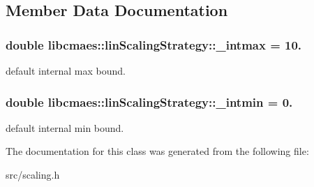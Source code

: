 \subsection{Member Data Documentation}
\hypertarget{classlibcmaes_1_1linScalingStrategy_a8d25d3fd0d901c010e925cf786b78d04}{
\subsubsection[{\+\_\+intmax}]{\setlength{\rightskip}{0pt plus 5cm}double libcmaes\+::lin\+Scaling\+Strategy\+::\+\_\+intmax = 10.}}\label{classlibcmaes_1_1linScalingStrategy_a8d25d3fd0d901c010e925cf786b78d04}
default internal max bound. \hypertarget{classlibcmaes_1_1linScalingStrategy_ab5cf302d085ee302ed180a4c29c25bf2}{
\subsubsection[{\+\_\+intmin}]{\setlength{\rightskip}{0pt plus 5cm}double libcmaes\+::lin\+Scaling\+Strategy\+::\+\_\+intmin = 0.}}\label{classlibcmaes_1_1linScalingStrategy_ab5cf302d085ee302ed180a4c29c25bf2}
default internal min bound. 

The documentation for this class was generated from the following file\+:\begin{DoxyCompactItemize}
\item 
src/scaling.\+h\end{DoxyCompactItemize}
